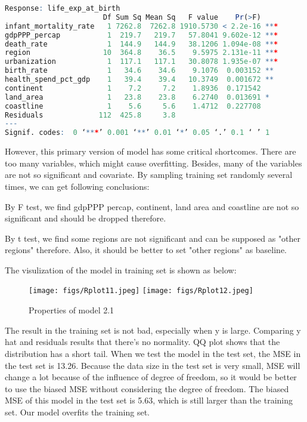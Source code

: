 \begin{lstlisting}[language=R, caption=Result of the model]
Response: life_exp_at_birth
                       Df Sum Sq Mean Sq   F value    Pr(>F)    
infant_mortality_rate   1 7262.8  7262.8 1910.5730 < 2.2e-16 ***
gdpPPP_percap           1  219.7   219.7   57.8041 9.602e-12 ***
death_rate              1  144.9   144.9   38.1206 1.094e-08 ***
region                 10  364.8    36.5    9.5975 2.131e-11 ***
urbanization            1  117.1   117.1   30.8078 1.935e-07 ***
birth_rate              1   34.6    34.6    9.1076  0.003152 ** 
health_spend_pct_gdp    1   39.4    39.4   10.3749  0.001672 ** 
continent               1    7.2     7.2    1.8936  0.171542    
land_area               1   23.8    23.8    6.2740  0.013691 *  
coastline               1    5.6     5.6    1.4712  0.227708    
Residuals             112  425.8     3.8                        
---
Signif. codes:  0 ‘***’ 0.001 ‘**’ 0.01 ‘*’ 0.05 ‘.’ 0.1 ‘ ’ 1
\end{lstlisting}

However, this primary version of model has some critical shortcomes. There are too many variables, which might cause overfitting. Besides, many of the variables are not so significant and covariate. By sampling training set randomly several times, we can get following conclusions:

By F test, we find gdpPPP percap, continent, land area and coastline are not so significant and should be dropped therefore.

By t test, we find some regions are not significant and can be supposed as "other regions" therefore. Also, it should be better to set "other regions" as baseline.

The visulization of the model in training set is shown as below:
\begin{figure}[!htbp]
\centering 
        \texttt{[image: figs/Rplot11.jpeg]}
        \texttt{[image: figs/Rplot12.jpeg]} \\
\caption[Properties of model 2.1]{Properties of model 2.1}
\label{fig:example} 
\end{figure}
The result in the training set is not bad, especially when y is large. Comparing y hat and residuals results that there's no normality. QQ plot shows that the distribution has a short tail. 
When we test the model in the test set, the MSE in the test set is 13.26. Because the data size in the test set is very small, MSE will change a lot because of the influence of degree of freedom, so it would be better to use the biased MSE without considering the degree of freedom. The biased MSE of this model in the test set is 5.63, which is still larger than the training set. Our model overfits the training set.

